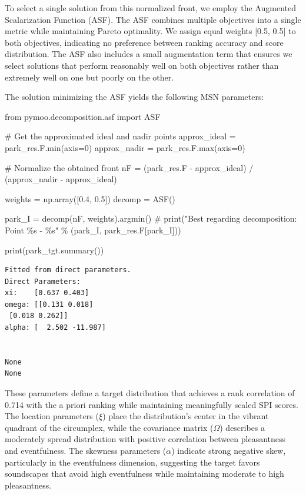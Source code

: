\documentclass[
  authoryear,
  preprint,
  3p]{elsarticle}
\newenvironment{Shaded}{\begin{snugshade}}{\end{snugshade}}
\newcommand{\BuiltInTok}[1]{\textcolor[rgb]{0.00,0.23,0.31}{#1}}
\newcommand{\CommentTok}[1]{\textcolor[rgb]{0.37,0.37,0.37}{#1}}
\newcommand{\DecValTok}[1]{\textcolor[rgb]{0.68,0.00,0.00}{#1}}
\newcommand{\FloatTok}[1]{\textcolor[rgb]{0.68,0.00,0.00}{#1}}
\newcommand{\ImportTok}[1]{\textcolor[rgb]{0.00,0.46,0.62}{#1}}
\newcommand{\NormalTok}[1]{\textcolor[rgb]{0.00,0.23,0.31}{#1}}
\newcommand{\OperatorTok}[1]{\textcolor[rgb]{0.37,0.37,0.37}{#1}}
\begin{document}
To select a single solution from this normalized front, we employ the
Augmented Scalarization Function (ASF). The ASF combines multiple
objectives into a single metric while maintaining Pareto optimality. We
assign equal weights {[}0.5, 0.5{]} to both objectives, indicating no
preference between ranking accuracy and score distribution. The ASF also
includes a small augmentation term that ensures we select solutions that
perform reasonably well on both objectives rather than extremely well on
one but poorly on the other.

The solution minimizing the ASF yields the following MSN parameters:

\label{park_tgt}
\begin{Shaded}
\begin{Highlighting}[]
\ImportTok{from}\NormalTok{ pymoo.decomposition.asf }\ImportTok{import}\NormalTok{ ASF}

\CommentTok{\# Get the approximated ideal and nadir points}
\NormalTok{approx\_ideal }\OperatorTok{=}\NormalTok{ park\_res.F.}\BuiltInTok{min}\NormalTok{(axis}\OperatorTok{=}\DecValTok{0}\NormalTok{)}
\NormalTok{approx\_nadir }\OperatorTok{=}\NormalTok{ park\_res.F.}\BuiltInTok{max}\NormalTok{(axis}\OperatorTok{=}\DecValTok{0}\NormalTok{)}

\CommentTok{\# Normalize the obtained front}
\NormalTok{nF }\OperatorTok{=}\NormalTok{ (park\_res.F }\OperatorTok{{-}}\NormalTok{ approx\_ideal) }\OperatorTok{/}\NormalTok{ (approx\_nadir }\OperatorTok{{-}}\NormalTok{ approx\_ideal)}

\NormalTok{weights }\OperatorTok{=}\NormalTok{ np.array([}\FloatTok{0.4}\NormalTok{, }\FloatTok{0.5}\NormalTok{])}
\NormalTok{decomp }\OperatorTok{=}\NormalTok{ ASF()}

\NormalTok{park\_I }\OperatorTok{=}\NormalTok{ decomp(nF, weights).argmin()}
\CommentTok{\# print("Best regarding decomposition: Point \%s {-} \%s" \% (park\_I, park\_res.F[park\_I]))}

\BuiltInTok{print}\NormalTok{(park\_tgt.summary())}
\end{Highlighting}
\end{Shaded}

\begin{verbatim}
Fitted from direct parameters.
Direct Parameters:
xi:    [0.637 0.403]
omega: [[0.131 0.018]
 [0.018 0.262]]
alpha: [  2.502 -11.987]


None
None
\end{verbatim}

These parameters define a target distribution that achieves a rank
correlation of 0.714 with the a priori ranking while maintaining
meaningfully scaled SPI scores. The location parameters (\(\xi\)) place
the distribution's center in the vibrant quadrant of the circumplex,
while the covariance matrix (\(\Omega\)) describes a moderately spread
distribution with positive correlation between pleasantness and
eventfulness. The skewness parameters (\(\alpha\)) indicate strong
negative skew, particularly in the eventfulness dimension, suggesting
the target favors soundscapes that avoid high eventfulness while
maintaining moderate to high pleasantness.
\end{document}
